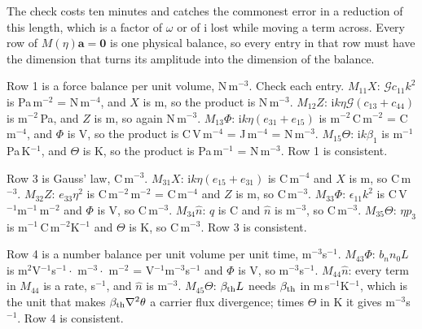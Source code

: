 \documentclass[11pt]{article}
\makeatletter
\newif\ifshowworked
\newenvironment{worked}{%
  \ifshowworked\par\smallskip\noindent\textit{Working.}\par\smallskip\else
  \setbox\z@\vbox\bgroup\fi}{\ifshowworked\par\smallskip\else\egroup\fi}
\newcommand{\ii}{\mathrm{i}}
\newcommand{\Gcal}{\mathcal{G}}
\makeatother
\begin{document}
The check costs ten minutes and catches the commonest error in a reduction of this length, which is a
factor of $\omega$ or of $\ii$ lost while moving a term across. Every row of $M(\eta)\mathbf a=\mathbf 0$
is one physical balance, so every entry in that row must have the dimension that turns its amplitude into
the dimension of the balance.

\begin{worked}
Row 1 is a force balance per unit volume, N\,m$^{-3}$. Check each entry.
$M_{11}X$: $\Gcal c_{11}k^2$ is Pa\,m$^{-2}$ = N\,m$^{-4}$, and $X$ is m, so the product is N\,m$^{-3}$.
$M_{12}Z$: $\ii k\eta\Gcal(c_{13}+c_{44})$ is m$^{-2}\,$Pa, and $Z$ is m, so again N\,m$^{-3}$.
$M_{13}\Phi$: $\ii k\eta(e_{31}+e_{15})$ is m$^{-2}$\,C\,m$^{-2}$ = C\,m$^{-4}$, and $\Phi$ is V, so the
product is C\,V\,m$^{-4}$ = J\,m$^{-4}$ = N\,m$^{-3}$.
$M_{15}\Theta$: $\ii k\beta_1$ is m$^{-1}$\,Pa\,K$^{-1}$, and $\Theta$ is K, so the product is
Pa\,m$^{-1}$ = N\,m$^{-3}$. Row 1 is consistent.
\end{worked}

\begin{worked}
Row 3 is Gauss' law, C\,m$^{-3}$. $M_{31}X$: $\ii k\eta(e_{15}+e_{31})$ is C\,m$^{-4}$ and $X$ is m, so
C\,m$^{-3}$. $M_{32}Z$: $e_{33}\eta^2$ is C\,m$^{-2}$\,m$^{-2}$ = C\,m$^{-4}$ and $Z$ is m, so C\,m$^{-3}$.
$M_{33}\Phi$: $\epsilon_{11}k^2$ is C\,V$^{-1}$m$^{-1}$\,m$^{-2}$ and $\Phi$ is V, so C\,m$^{-3}$.
$M_{34}\hat n$: $q$ is C and $\hat n$ is m$^{-3}$, so C\,m$^{-3}$.
$M_{35}\Theta$: $\eta p_3$ is m$^{-1}$\,C\,m$^{-2}$K$^{-1}$ and $\Theta$ is K, so C\,m$^{-3}$. Row 3 is
consistent.
\end{worked}

\begin{worked}
Row 4 is a number balance per unit volume per unit time, m$^{-3}$s$^{-1}$.
$M_{43}\Phi$: $b_nn_0L$ is m$^2$V$^{-1}$s$^{-1}\cdot$ m$^{-3}\cdot$ m$^{-2}$ = V$^{-1}$m$^{-3}$s$^{-1}$ and
$\Phi$ is V, so m$^{-3}$s$^{-1}$.
$M_{44}\hat n$: every term in $M_{44}$ is a rate, s$^{-1}$, and $\hat n$ is m$^{-3}$.
$M_{45}\Theta$: $\beta_{\rm th}L$ needs $\beta_{\rm th}$ in m\,s$^{-1}$K$^{-1}$, which is the unit that
makes $\beta_{\rm th}\nabla^2\theta$ a carrier flux divergence; times $\Theta$ in K it gives
m$^{-3}$s$^{-1}$. Row 4 is consistent.
\end{worked}
\end{document}

